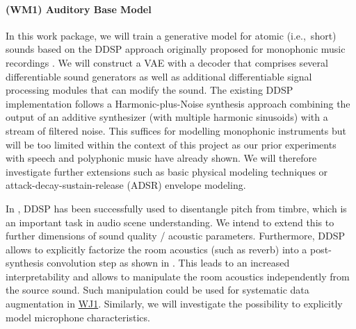 \documentclass[11pt]{article}
\newcommand{\wpdef}[2]{\hypertarget{sec:W#1}{\paragraph*{(W#1) #2}\label{sec:W#1}}}
\newcommand{\wpref}[2]{\hyperlink{sec:W#1}{#2}}
\begin{document}
\wpdef{M1}{Auditory Base Model} %
In this work package, we will train a generative model for atomic (i.e.,~short) sounds based on the DDSP approach originally proposed for monophonic music recordings \cite{engel2020ddsp}.
We will construct a VAE with a decoder that comprises several differentiable sound generators as well as additional differentiable signal processing modules that can modify the sound.
The existing DDSP implementation follows a Harmonic-plus-Noise synthesis approach combining the output of an additive synthesizer (with multiple harmonic sinusoids) with a stream of filtered noise.
This suffices for modelling monophonic instruments but will be too limited within the context of this project as our prior experiments with speech and polyphonic music have already shown.
We will therefore investigate further extensions
such as basic physical modeling techniques 
or attack-decay-sustain-release (ADSR) envelope modeling.

In \cite{engel2020self}, DDSP has been successfully used to disentangle pitch from timbre, which is an important task in audio scene understanding.
We intend to extend this to further dimensions of sound quality / acoustic parameters.
Furthermore, DDSP allows to explicitly factorize the room acoustics (such as reverb) into a post-synthesis convolution step as shown in \cite{engel2020ddsp}.
This leads to an increased interpretability and allows to manipulate the room acoustics independently from the source sound. 
Such manipulation could be used for systematic data augmentation in \wpref{J1}{WJ1}.
Similarly, we will investigate the possibility to explicitly model microphone characteristics.
\end{document}
